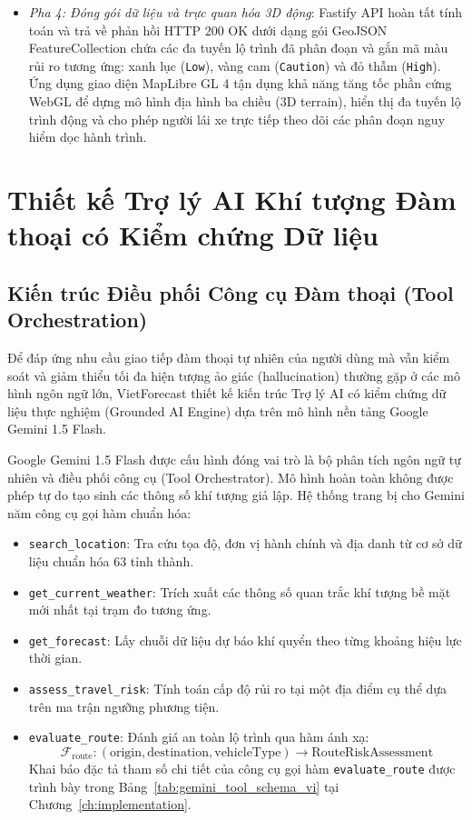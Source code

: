 \begin{itemize}
    \item[-] \textit{Pha 4: Đóng gói dữ liệu và trực quan hóa 3D động}:
    Fastify API hoàn tất tính toán và trả về phản hồi HTTP 200 OK dưới dạng gói GeoJSON FeatureCollection chứa các đa tuyến lộ trình đã phân đoạn và gắn mã màu rủi ro tương ứng: xanh lục (\texttt{Low}), vàng cam (\texttt{Caution}) và đỏ thẫm (\texttt{High}). Ứng dụng giao diện MapLibre GL 4 tận dụng khả năng tăng tốc phần cứng WebGL để dựng mô hình địa hình ba chiều (3D terrain), hiển thị đa tuyến lộ trình động và cho phép người lái xe trực tiếp theo dõi các phân đoạn nguy hiểm dọc hành trình.
\end{itemize}

\section{Thiết kế Trợ lý AI Khí tượng Đàm thoại có Kiểm chứng Dữ liệu}
\label{sec:grounded_ai_assistant}

\subsection{Kiến trúc Điều phối Công cụ Đàm thoại (Tool Orchestration)}
Để đáp ứng nhu cầu giao tiếp đàm thoại tự nhiên của người dùng mà vẫn kiểm soát và giảm thiểu tối đa hiện tượng ảo giác (hallucination) thường gặp ở các mô hình ngôn ngữ lớn, VietForecast thiết kế kiến trúc Trợ lý AI có kiểm chứng dữ liệu thực nghiệm (Grounded AI Engine) dựa trên mô hình nền tảng Google Gemini 1.5 Flash.

Google Gemini 1.5 Flash được cấu hình đóng vai trò là bộ phân tích ngôn ngữ tự nhiên và điều phối công cụ (Tool Orchestrator). Mô hình hoàn toàn không được phép tự do tạo sinh các thông số khí tượng giả lập. Hệ thống trang bị cho Gemini năm công cụ gọi hàm chuẩn hóa:
\begin{itemize}
    \item[-] \texttt{search\_location}: Tra cứu tọa độ, đơn vị hành chính và địa danh từ cơ sở dữ liệu chuẩn hóa 63 tỉnh thành.
    \item[-] \texttt{get\_current\_weather}: Trích xuất các thông số quan trắc khí tượng bề mặt mới nhất tại trạm đo tương ứng.
    \item[-] \texttt{get\_forecast}: Lấy chuỗi dữ liệu dự báo khí quyển theo từng khoảng hiệu lực thời gian.
    \item[-] \texttt{assess\_travel\_risk}: Tính toán cấp độ rủi ro tại một địa điểm cụ thể dựa trên ma trận ngưỡng phương tiện.
    \item[-] \texttt{evaluate\_route}: Đánh giá an toàn lộ trình qua hàm ánh xạ:
    \begin{equation}
    \label{eq:tool_evaluate_route_vi}
    \mathcal{F}_{\text{route}}: (\text{origin}, \text{destination}, \text{vehicleType}) \longrightarrow \text{RouteRiskAssessment}
    \end{equation}
    Khai báo đặc tả tham số chi tiết của công cụ gọi hàm \texttt{evaluate\_route} được trình bày trong Bảng~\ref{tab:gemini_tool_schema_vi} tại Chương~\ref{ch:implementation}.
\end{itemize}

